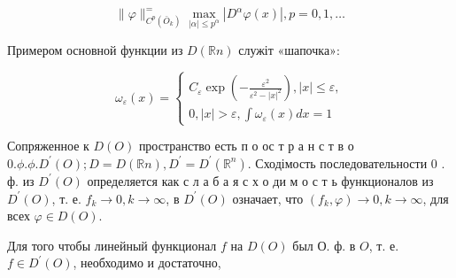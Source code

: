\documentclass[10pt]{article}
\begin{document}
\[

\|\varphi\|_{C^{p}\left(\bar{O}_{k}\right)}^{=} \max _{|\alpha| \leqslant p^{\alpha}}\left|D^{\alpha} \varphi(x)\right|, p=0,1, \ldots

\]



Примером основной функции из $D(\mathbb{R} n)$ служіт «шапочка»:



\[

\omega_{\varepsilon}(x)=\left\{\begin{array}{l}

C_{\varepsilon} \exp \left(-\frac{\varepsilon^{2}}{\varepsilon^{2}-|x|^{2}}\right),|x| \leqslant \varepsilon, \\

0,|x|>\varepsilon, \int \omega_{\varepsilon}(x) d x=1

\end{array}\right.

\]



Сопряженное к $D(O)$ пространство есть п о ос т р а н с т в о $0 . \phi . \phi . D^{\prime}(O) ; D=D(\mathbb{R} n), D^{\prime}=D^{\prime}\left(\mathbb{R}^{n}\right)$. Сходімость последовательности 0 . ф. из $D^{\prime}(O)$ определяется как с л а б а я с х о ди м о с т ь функционалов из $D^{\prime}(O)$, т. е. $f_{k} \rightarrow 0, k \rightarrow \infty$, в $D^{\prime}(O)$ означает, что $\left(f_{k}, \varphi\right) \rightarrow 0, k \rightarrow \infty$, для всех $\varphi \in D(O)$.



Для того чтобы линейный функционал $f$ на $D(O)$ был О. ф. в $O$, т. е. $f \in D^{\prime}(O)$, необходимо и достаточно,
\end{document}
